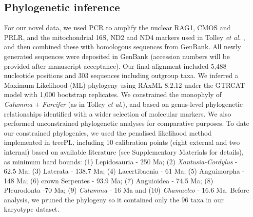 \documentclass[a4paper, 12pt]{article}
\begin{document}
\subsection{Phylogenetic inference}
For our novel data, we used PCR to amplify the nuclear RAG1, CMOS and PRLR, and the mitochondrial 16S, ND2 and ND4 markers used in Tolley \textit{et al.} \cite{tolley2013large}, and then combined these with homologous sequences from GenBank. 
All newly generated sequences were deposited in GenBank (accession numbers will be provided after manuscript acceptance). 
Our final alignment included 5,488 nucleotide positions and 303 sequences including outgroup taxa. 
We inferred a Maximum Likelihood (ML) phylogeny using RAxML 8.2.12\cite{stamatakis2014raxml} under the GTRCAT model with 1,000 bootstrap replicates. 
We constrained the monophyly of \textit{Calumma} $+$ \textit{Furcifer} (as in Tolley \textit{et al.}\cite{tolley2013large}), and based on genus-level phylogenetic relationships identified with a wider selection of molecular markers. 
We also performed unconstrained phylogenetic analyses for comparative purposes. 
To date our constrained phylogenies, we used the penalised likelihood method implemented in treePL\cite{smith2012treepl}, including 10 calibration points (eight external and two internal) based on available literature (see Supplementary Materials for details), as minimum hard bounds: (1) Lepidosauria - 250 Ma; (2) \textit{Xantusia-Cordylus} - 62.5 Ma; (3) Laterata - 138.7 Ma; (4) Lacertibaenia - 61 Ma; (5) Anguimorpha - 148 Ma; (6) crown Serpentes - 93.9 Ma; (7) Anguioidea - 74.5 Ma; (8) Pleurodonta -70 Ma; (9) \textit{Calumma} - 16 Ma and (10) \textit{Chamaeleo} - 16.6 Ma. 
Before analysis, we pruned the phylogeny so it contained only the 96 taxa in our karyotype dataset.
\end{document}
